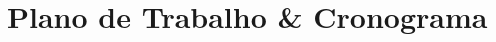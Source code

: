 \chapter[Plano de Trabalho \& Cronograma]{Plano de Trabalho \& Cronograma}\label{PlanoTrabalhoCronograma}





  

  
